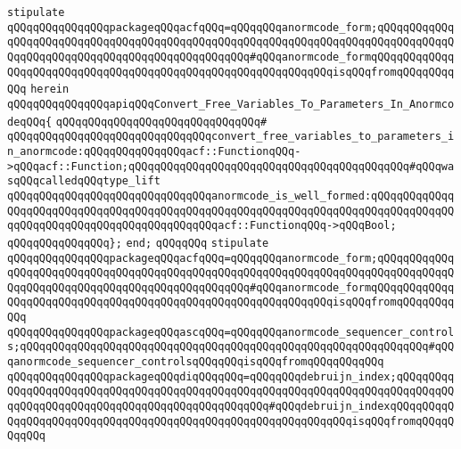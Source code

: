 \verb|stipulate|\newline
\verb|qQQqqQQqqQQqqQQqpackageqQQqacfqQQq=qQQqqQQqanormcode_form;qQQqqQQqqQQqqQQqqQQqqQQqqQQqqQQqqQQqqQQqqQQqqQQqqQQqqQQqqQQqqQQqqQQqqQQqqQQqqQQqqQQqqQQqqQQqqQQqqQQqqQQqqQQqqQQqqQQqqQQq#qQQqanormcode_formqQQqqQQqqQQqqQQqqQQqqQQqqQQqqQQqqQQqqQQqqQQqqQQqqQQqqQQqqQQqqQQqisqQQqfromqQQqqQQqqQQq|\newline
\verb|herein|\newline
\newline
\verb|qQQqqQQqqQQqqQQqapiqQQqConvert_Free_Variables_To_Parameters_In_AnormcodeqQQq{|\newline
\verb|qQQqqQQqqQQqqQQqqQQqqQQqqQQqqQQq#|\newline
\verb|qQQqqQQqqQQqqQQqqQQqqQQqqQQqqQQqconvert_free_variables_to_parameters_in_anormcode:qQQqqQQqqQQqqQQqacf::FunctionqQQq->qQQqacf::Function;qQQqqQQqqQQqqQQqqQQqqQQqqQQqqQQqqQQqqQQqqQQq#qQQqwasqQQqcalledqQQqtype_lift|\newline
\verb|qQQqqQQqqQQqqQQqqQQqqQQqqQQqqQQqanormcode_is_well_formed:qQQqqQQqqQQqqQQqqQQqqQQqqQQqqQQqqQQqqQQqqQQqqQQqqQQqqQQqqQQqqQQqqQQqqQQqqQQqqQQqqQQqqQQqqQQqqQQqqQQqqQQqqQQqqQQqqQQqacf::FunctionqQQq->qQQqBool;|\newline
\verb|qQQqqQQqqQQqqQQq};|\newline
\verb|end;|\newline
\verb|qQQqqQQq|\newline
\newline
\verb|stipulate|\newline
\verb|qQQqqQQqqQQqqQQqpackageqQQqacfqQQq=qQQqqQQqanormcode_form;qQQqqQQqqQQqqQQqqQQqqQQqqQQqqQQqqQQqqQQqqQQqqQQqqQQqqQQqqQQqqQQqqQQqqQQqqQQqqQQqqQQqqQQqqQQqqQQqqQQqqQQqqQQqqQQqqQQqqQQq#qQQqanormcode_formqQQqqQQqqQQqqQQqqQQqqQQqqQQqqQQqqQQqqQQqqQQqqQQqqQQqqQQqqQQqqQQqisqQQqfromqQQqqQQqqQQq|\newline
\verb|qQQqqQQqqQQqqQQqpackageqQQqascqQQq=qQQqqQQqanormcode_sequencer_controls;qQQqqQQqqQQqqQQqqQQqqQQqqQQqqQQqqQQqqQQqqQQqqQQqqQQqqQQqqQQqqQQq#qQQqanormcode_sequencer_controlsqQQqqQQqisqQQqfromqQQqqQQqqQQq|\newline
\verb|qQQqqQQqqQQqqQQqpackageqQQqdiqQQqqQQq=qQQqqQQqdebruijn_index;qQQqqQQqqQQqqQQqqQQqqQQqqQQqqQQqqQQqqQQqqQQqqQQqqQQqqQQqqQQqqQQqqQQqqQQqqQQqqQQqqQQqqQQqqQQqqQQqqQQqqQQqqQQqqQQqqQQqqQQq#qQQqdebruijn_indexqQQqqQQqqQQqqQQqqQQqqQQqqQQqqQQqqQQqqQQqqQQqqQQqqQQqqQQqqQQqqQQqisqQQqfromqQQqqQQqqQQq|\newline
